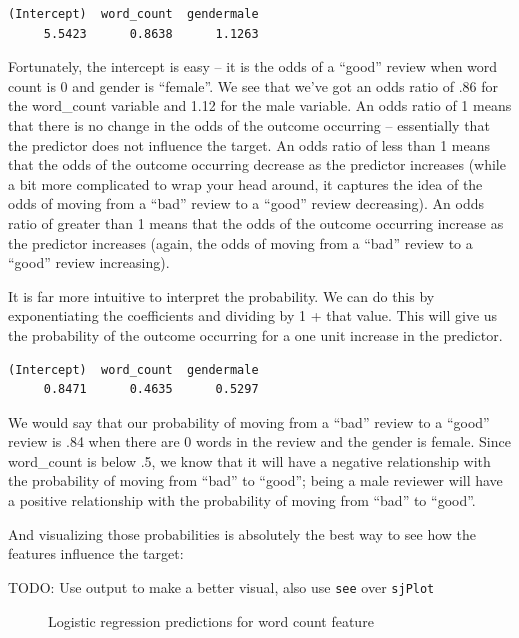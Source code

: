 \documentclass[
  letterpaper,
]{krantz}
\begin{document}
\begin{verbatim}
(Intercept)  word_count  gendermale 
     5.5423      0.8638      1.1263 
\end{verbatim}

Fortunately, the intercept is easy -- it is the odds of a ``good''
review when word count is 0 and gender is ``female''. We see that we've
got an odds ratio of .86 for the word\_count variable and 1.12 for the
male variable. An odds ratio of 1 means that there is no change in the
odds of the outcome occurring -- essentially that the predictor does not
influence the target. An odds ratio of less than 1 means that the odds
of the outcome occurring decrease as the predictor increases (while a
bit more complicated to wrap your head around, it captures the idea of
the odds of moving from a ``bad'' review to a ``good'' review
decreasing). An odds ratio of greater than 1 means that the odds of the
outcome occurring increase as the predictor increases (again, the odds
of moving from a ``bad'' review to a ``good'' review increasing).

It is far more intuitive to interpret the probability. We can do this by
exponentiating the coefficients and dividing by 1 + that value. This
will give us the probability of the outcome occurring for a one unit
increase in the predictor.

\begin{verbatim}
(Intercept)  word_count  gendermale 
     0.8471      0.4635      0.5297 
\end{verbatim}

We would say that our probability of moving from a ``bad'' review to a
``good'' review is .84 when there are 0 words in the review and the
gender is female. Since word\_count is below .5, we know that it will
have a negative relationship with the probability of moving from ``bad''
to ``good''; being a male reviewer will have a positive relationship
with the probability of moving from ``bad'' to ``good''.

And visualizing those probabilities is absolutely the best way to see
how the features influence the target:

TODO: Use output to make a better visual, also use \texttt{see} over
\texttt{sjPlot}

\begin{figure}[H]


\caption{\label{fig-logistic-regression-count}Logistic regression
predictions for word count feature}

\end{figure}%
\end{document}
